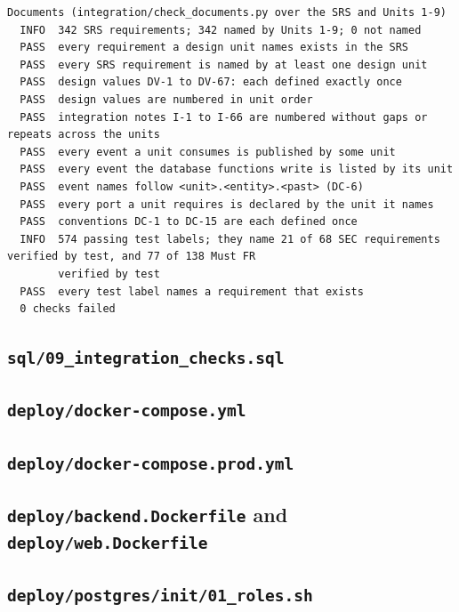 \documentclass[11pt,a4paper]{article}
\begin{document}
{\begin{verbatim}
Documents (integration/check_documents.py over the SRS and Units 1-9)
  INFO  342 SRS requirements; 342 named by Units 1-9; 0 not named
  PASS  every requirement a design unit names exists in the SRS
  PASS  every SRS requirement is named by at least one design unit
  PASS  design values DV-1 to DV-67: each defined exactly once
  PASS  design values are numbered in unit order
  PASS  integration notes I-1 to I-66 are numbered without gaps or repeats across the units
  PASS  every event a unit consumes is published by some unit
  PASS  every event the database functions write is listed by its unit
  PASS  event names follow <unit>.<entity>.<past> (DC-6)
  PASS  every port a unit requires is declared by the unit it names
  PASS  conventions DC-1 to DC-15 are each defined once
  INFO  574 passing test labels; they name 21 of 68 SEC requirements verified by test, and 77 of 138 Must FR
        verified by test
  PASS  every test label names a requirement that exists
  0 checks failed
\end{verbatim}
}

\subsection{\texttt{sql/09\_\allowbreak integration\_\allowbreak checks.\allowbreak sql}}

\subsection{\texttt{deploy/docker-compose.\allowbreak yml}}

\subsection{\texttt{deploy/docker-compose.\allowbreak prod.\allowbreak yml}}

\subsection{\texttt{deploy/backend.\allowbreak Dockerfile} and \texttt{deploy/web.\allowbreak Dockerfile}}


\subsection{\texttt{deploy/postgres/init/01\_\allowbreak roles.\allowbreak sh}}

\end{document}
